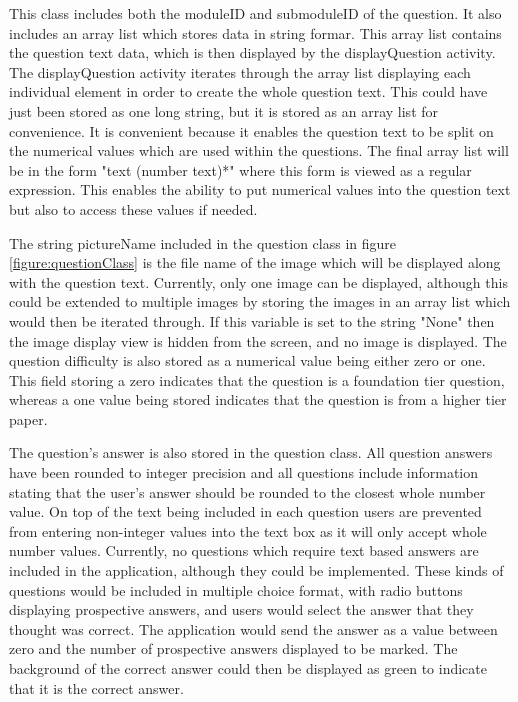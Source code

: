 \documentclass{article}
\begin{document}
This class includes both the moduleID and submoduleID of the question. It also includes an array list which stores data in string formar. This array list contains the question text data, which is then displayed by the displayQuestion activity. The displayQuestion activity iterates through the array list displaying each individual element in order to create the whole question text. This could have just been stored as one long string, but it is stored as an array list for convenience. It is convenient because it enables the question text to be split on the numerical values which are used within the questions. The final array list will be in the form "text (number text)*" where this form is viewed as a regular expression. This enables the ability to put numerical values into the question text but also to access these values if needed. \par

The string pictureName included in the question class in figure \ref{figure:questionClass} is the file name of the image which will be displayed along with the question text. Currently, only one image can be displayed, although this could be extended to multiple images by storing the images in an array list which would then be iterated through. If this variable is set to the string "None" then the image display view is hidden from the screen, and no image is displayed. The question difficulty is also stored as a numerical value being either zero or one. This field storing a zero indicates that the question is a foundation tier question, whereas a one value being stored indicates that the question is from a higher tier paper. \par

The question's answer is also stored in the question class. All question answers have been rounded to integer precision and all questions include information stating that the user's answer should be rounded to the closest whole number value. On top of the text being included in each question users are prevented from entering non-integer values into the text box as it will only accept whole number values. Currently, no questions which require text based answers are included in the application, although they could be implemented. These kinds of questions would be included in multiple choice format, with radio buttons displaying prospective answers, and users would select the answer that they thought was correct. The application would send the answer as a value between zero and the number of prospective answers displayed to be marked. The background of the correct answer could then be displayed as green to indicate that it is the correct answer. \par
\end{document}
